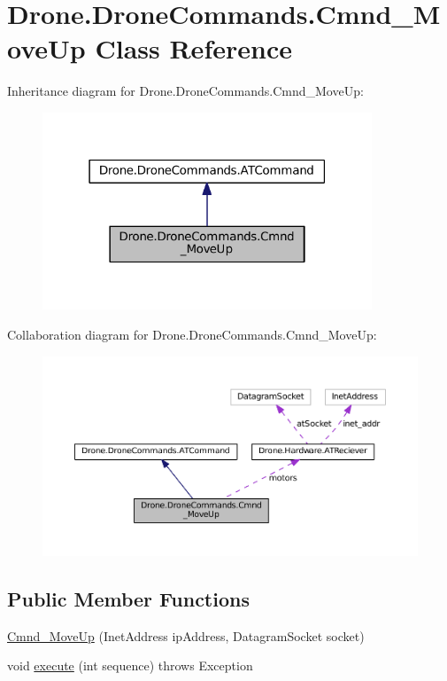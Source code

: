 \hypertarget{class_drone_1_1_drone_commands_1_1_cmnd___move_up}{}\section{Drone.\+Drone\+Commands.\+Cmnd\+\_\+\+Move\+Up Class Reference}
\label{class_drone_1_1_drone_commands_1_1_cmnd___move_up}


Inheritance diagram for Drone.\+Drone\+Commands.\+Cmnd\+\_\+\+Move\+Up\+:\nopagebreak
\begin{figure}[H]
\begin{center}
\leavevmode
\includegraphics[width=279pt]{class_drone_1_1_drone_commands_1_1_cmnd___move_up__inherit__graph}
\end{center}
\end{figure}


Collaboration diagram for Drone.\+Drone\+Commands.\+Cmnd\+\_\+\+Move\+Up\+:\nopagebreak
\begin{figure}[H]
\begin{center}
\leavevmode
\includegraphics[width=350pt]{class_drone_1_1_drone_commands_1_1_cmnd___move_up__coll__graph}
\end{center}
\end{figure}
\subsection*{Public Member Functions}
\begin{DoxyCompactItemize}
\item 
\hyperlink{class_drone_1_1_drone_commands_1_1_cmnd___move_up_a61eaa7f1c6a2fdeed9ac9cfd2b5251b0}{Cmnd\+\_\+\+Move\+Up} (Inet\+Address ip\+Address, Datagram\+Socket socket)
\item 
void \hyperlink{class_drone_1_1_drone_commands_1_1_cmnd___move_up_acd81d9358005473be57b6bb615848bd4}{execute} (int sequence)  throws Exception  	
\end{DoxyCompactItemize}
